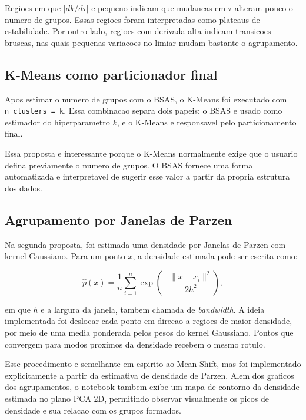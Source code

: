 \documentclass[12pt,a4paper]{article}
\begin{document}
Regioes em que $|dk/d\tau|$ e pequeno indicam que mudancas em $\tau$ alteram
pouco o numero de grupos. Essas regioes foram interpretadas como plateaus de
estabilidade. Por outro lado, regioes com derivada alta indicam transicoes
bruscas, nas quais pequenas variacoes no limiar mudam bastante o agrupamento.

\subsection{K-Means como particionador final}

Apos estimar o numero de grupos com o BSAS, o K-Means foi executado com
\texttt{n\_clusters = k}. Essa combinacao separa dois papeis: o BSAS e usado
como estimador do hiperparametro $k$, e o K-Means e responsavel pelo
particionamento final.

Essa proposta e interessante porque o K-Means normalmente exige que o usuario
defina previamente o numero de grupos. O BSAS fornece uma forma automatizada e
interpretavel de sugerir esse valor a partir da propria estrutura dos dados.

\subsection{Agrupamento por Janelas de Parzen}

Na segunda proposta, foi estimada uma densidade por Janelas de Parzen com kernel
Gaussiano. Para um ponto $x$, a densidade estimada pode ser escrita como:

\begin{equation}
    \hat{p}(x) =
    \frac{1}{n}
    \sum_{i=1}^{n}
    \exp\left(
        -\frac{\lVert x - x_i \rVert^2}{2h^2}
    \right),
\end{equation}

em que $h$ e a largura da janela, tambem chamada de \textit{bandwidth}. A ideia
implementada foi deslocar cada ponto em direcao a regioes de maior densidade,
por meio de uma media ponderada pelos pesos do kernel Gaussiano. Pontos que
convergem para modos proximos da densidade recebem o mesmo rotulo.

Esse procedimento e semelhante em espirito ao Mean Shift, mas foi implementado
explicitamente a partir da estimativa de densidade de Parzen. Alem dos graficos
dos agrupamentos, o notebook tambem exibe um mapa de contorno da densidade
estimada no plano PCA 2D, permitindo observar visualmente os picos de densidade
e sua relacao com os grupos formados.
\end{document}
